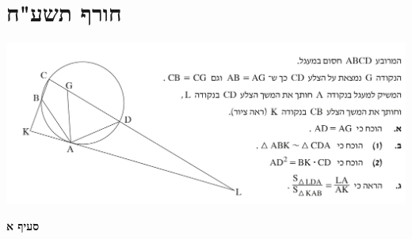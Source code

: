 \documentclass[12pt,a4paper]{article}
\begin{document}
\newpage

\section{חורף תשע"ח}

\begin{center}
\includegraphics[width=\textwidth]{winter-2018-4}
\end{center}
\vspace{-8mm}

\textbf{סעיף א}
\end{document}
